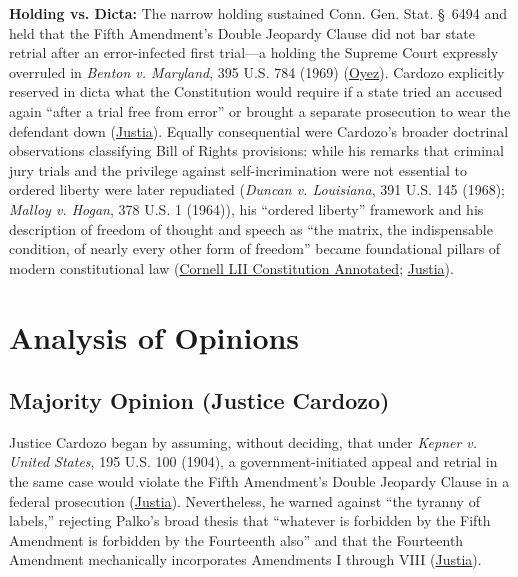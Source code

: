 \documentclass[12pt]{article}
\begin{document}
\textbf{Holding vs. Dicta:} The narrow holding sustained Conn. Gen. Stat. \S~6494 and held that the Fifth Amendment's Double Jeopardy Clause did not bar state retrial after an error-infected first trial---a holding the Supreme Court expressly overruled in \textit{Benton v. Maryland}, 395 U.S. 784 (1969) (\href{https://www.oyez.org/cases/1900-1940/302us319}{Oyez}). Cardozo explicitly reserved in dicta what the Constitution would require if a state tried an accused again ``after a trial free from error'' or brought a separate prosecution to wear the defendant down (\href{https://supreme.justia.com/cases/federal/us/302/319/}{Justia}). Equally consequential were Cardozo's broader doctrinal observations classifying Bill of Rights provisions: while his remarks that criminal jury trials and the privilege against self-incrimination were not essential to ordered liberty were later repudiated (\textit{Duncan v. Louisiana}, 391 U.S. 145 (1968); \textit{Malloy v. Hogan}, 378 U.S. 1 (1964)), his ``ordered liberty'' framework and his description of freedom of thought and speech as ``the matrix, the indispensable condition, of nearly every other form of freedom'' became foundational pillars of modern constitutional law (\href{https://www.law.cornell.edu/constitution-conan/amendment-14/section-1/due-process-clause-and-incorporation-early-doctrine}{Cornell LII Constitution Annotated}; \href{https://supreme.justia.com/cases/federal/us/302/319/}{Justia}).

\section{Analysis of Opinions}

\subsection{Majority Opinion (Justice Cardozo)}

Justice Cardozo began by assuming, without deciding, that under \textit{Kepner v. United States}, 195 U.S. 100 (1904), a government-initiated appeal and retrial in the same case would violate the Fifth Amendment's Double Jeopardy Clause in a federal prosecution (\href{https://supreme.justia.com/cases/federal/us/302/319/}{Justia}). Nevertheless, he warned against ``the tyranny of labels,'' rejecting Palko's broad thesis that ``whatever is forbidden by the Fifth Amendment is forbidden by the Fourteenth also'' and that the Fourteenth Amendment mechanically incorporates Amendments I through VIII (\href{https://supreme.justia.com/cases/federal/us/302/319/}{Justia}).
\end{document}
